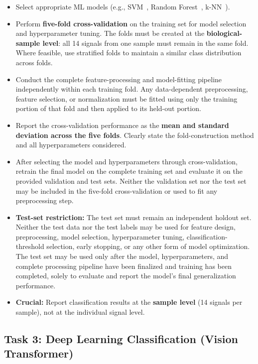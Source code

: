 \documentclass[11pt]{article}
\begin{document}
\begin{itemize}
    \item Select appropriate ML models (e.g., SVM~\cite{cortes1995svm}, Random Forest~\cite{breiman2001rf}, k-NN~\cite{cover1967nn}).
    \item Perform \textbf{five-fold cross-validation} on the training set for model selection and hyperparameter tuning. The folds must be created at the \textbf{biological-sample level}: all 14 signals from one sample must remain in the same fold. Where feasible, use stratified folds to maintain a similar class distribution across folds.
    \item Conduct the complete feature-processing and model-fitting pipeline independently within each training fold. Any data-dependent preprocessing, feature selection, or normalization must be fitted using only the training portion of that fold and then applied to its held-out portion.
    \item Report the cross-validation performance as the \textbf{mean and standard deviation across the five folds}. Clearly state the fold-construction method and all hyperparameters considered.
    \item After selecting the model and hyperparameters through cross-validation, retrain the final model on the complete training set and evaluate it on the provided validation and test sets. Neither the validation set nor the test set may be included in the five-fold cross-validation or used to fit any preprocessing step.
    \item \textbf{Test-set restriction:} The test set must remain an independent holdout set. Neither the test data nor the test labels may be used for feature design, preprocessing, model selection, hyperparameter tuning, classification-threshold selection, early stopping, or any other form of model optimization. The test set may be used only after the model, hyperparameters, and complete processing pipeline have been finalized and training has been completed, solely to evaluate and report the model's final generalization performance.
    \item \textbf{Crucial:} Report classification results at the \textbf{sample level} (14 signals per sample), not at the individual signal level.
\end{itemize}

\subsection{Task 3: Deep Learning Classification (Vision Transformer)}
\end{document}
